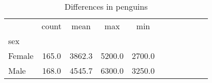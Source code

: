 \begin{table}
\centering
\caption{Differences in penguins}
\label{tab:features}
\begin{tabular}{lcccccccccc}
\toprule
{} &  count &    mean &     max &     min \\
sex    &        &         &         &         \\
\midrule
Female &  165.0 &  3862.3 &  5200.0 &  2700.0 \\
Male   &  168.0 &  4545.7 &  6300.0 &  3250.0 \\
\bottomrule
\end{tabular}
\end{table}
